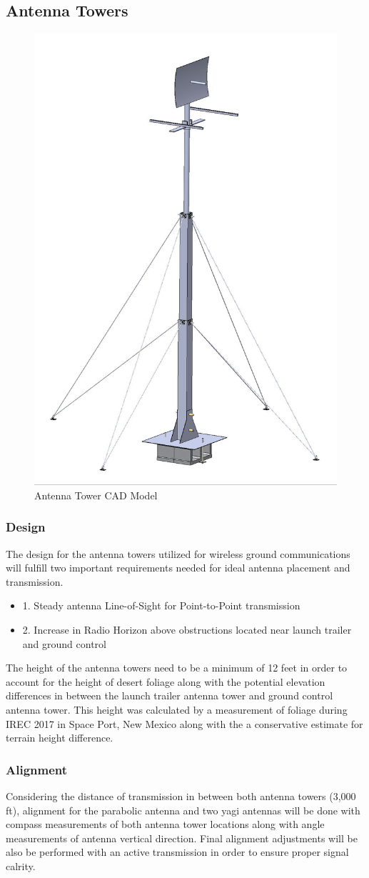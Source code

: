 \documentclass[10pt,a4paper]{article}
\begin{document}
\subsection{Antenna Towers}
\begin{figure}[h!]
	\centering
	\includegraphics[width=.5\textwidth]{./figs/AntennaMast.jpg}
	\caption{Antenna Tower CAD Model}
	\label{fig:example}
\end{figure}
\subsubsection{Design}
The design for the antenna towers utilized for wireless ground communications will fulfill two important requirements needed for ideal antenna placement and transmission. 
\begin{itemize}
	\item 1. Steady antenna Line-of-Sight for Point-to-Point transmission
	\item 2. Increase in Radio Horizon above obstructions located near launch trailer and ground control
\end{itemize}
The height of the antenna towers need to be a minimum of 12 feet in order to account for the height of desert foliage along with the potential elevation differences in between the launch trailer antenna tower and ground control antenna tower. This height was calculated by a measurement of foliage during IREC 2017 in Space Port, New Mexico along with the a conservative estimate for terrain height difference.
\subsubsection{Alignment}
Considering the distance of transmission in between both antenna towers (3,000 ft), alignment for the parabolic antenna and two yagi antennas will be done with compass measurements of both antenna tower locations along with angle measurements of antenna vertical direction. Final alignment adjustments will be also be performed with an active transmission in order to ensure proper signal calrity.
\end{document}
